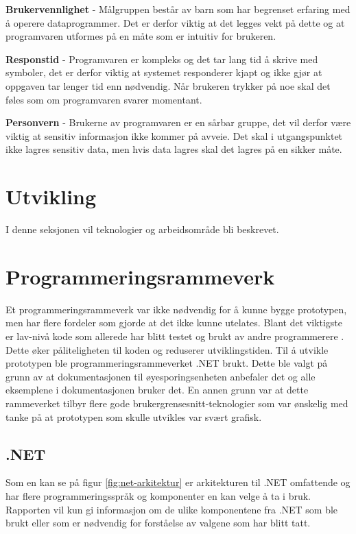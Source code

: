 \textbf{Brukervennlighet} - Målgruppen består av barn som har begrenset erfaring med å operere dataprogrammer. Det er derfor viktig at det legges vekt på dette og at programvaren utformes på en måte som er intuitiv for brukeren.   
 
 \textbf{Responstid} -  Programvaren er kompleks og det tar lang tid å skrive med symboler, det er derfor viktig at systemet responderer kjapt og ikke gjør at oppgaven tar lenger tid enn nødvendig. Når brukeren trykker på noe skal det føles som om programvaren svarer momentant. 

\textbf{Personvern} - Brukerne av programvaren er en sårbar gruppe, det vil derfor være viktig at sensitiv informasjon ikke kommer på avveie. Det skal i utgangspunktet ikke lagres sensitiv data, men hvis data lagres skal det lagres på en sikker måte. 
 
\section{Utvikling} 
I denne seksjonen vil teknologier og arbeidsområde bli beskrevet.  
 
\section{Programmeringsrammeverk} 

Et programmeringsrammeverk var ikke nødvendig for å kunne bygge prototypen, men har flere fordeler som gjorde at det ikke kunne utelates. Blant det viktigste er lav-nivå kode som allerede har blitt testet og brukt av andre programmerere \cite{Frame7:online}. Dette øker påliteligheten til koden og reduserer utviklingstiden.
Til å utvikle prototypen ble programmeringsrammeverket .NET brukt. Dette ble valgt på grunn av at dokumentasjonen til øyesporingsenheten anbefaler det og alle eksemplene i dokumentasjonen bruker det. En annen grunn var at dette rammeverket tilbyr flere gode brukergrensesnitt-teknologier som var ønskelig med tanke på at prototypen som skulle utvikles var svært grafisk.

\subsection{.NET}
 
Som en kan se på figur \ref{fig:net-arkitektur}  er arkitekturen til .NET omfattende og har flere programmeringsspråk og komponenter en kan velge å ta i bruk. Rapporten vil kun gi informasjon om de ulike komponentene fra .NET som ble brukt eller som er nødvendig for forståelse av valgene som har blitt tatt. 
 
